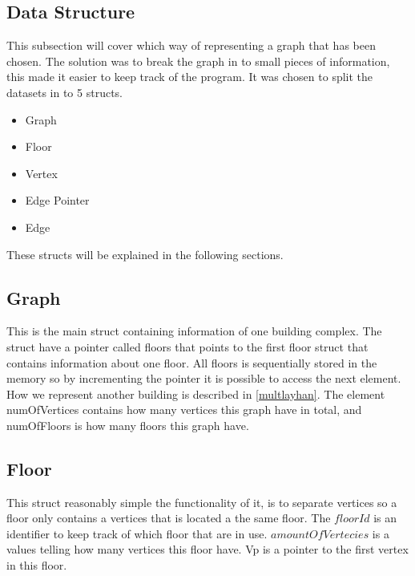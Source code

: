 
\subsection{Data Structure}
\label{sub:data_structure}

This subsection will cover which way of representing a graph that has been chosen. The solution was to break the graph in to small pieces of information, this made it easier to keep track of the program. It was chosen to split the datasets in to 5 structs.

\begin{minipage}{\linewidth}
\begin{itemize} [noitemsep]
	\item Graph
	\item Floor
	\item Vertex
	\item Edge Pointer
	\item Edge
\end{itemize}
\end{minipage}

These structs will be explained in the following sections. 

\begin{minipage}{\linewidth}
\subsection{Graph} 
This is the main struct containing information of one building complex.
The struct have a pointer called floors that points to the first floor struct that contains information about one floor. All floors is sequentially stored in the memory so by incrementing the pointer it is possible to access the next element. How we represent another building is described in \cref{multlayhan}. The element numOfVertices contains how many vertices this graph have in total, and numOfFloors is how many floors this graph have.


 \label{Graph_struct}
\end{minipage}

\begin{minipage}{\linewidth}
\subsection{Floor} \label{subsub:floor}
This struct reasonably simple the functionality of it, is to separate vertices so a floor only contains a vertices that is located a the same floor. The $floorId$ is an identifier to keep track of which floor that are in use.
$amountOfVertecies$ is a values telling how many vertices this floor have. Vp is a pointer to the first vertex in this floor.

 \label{Floor_struct}
\end{minipage}

